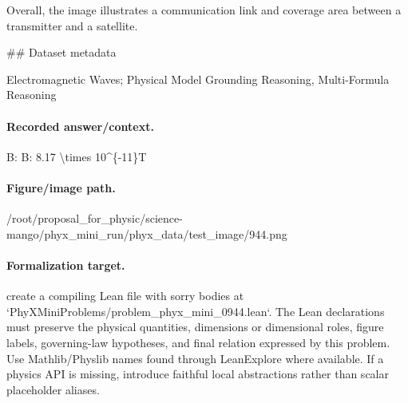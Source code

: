 Overall, the image illustrates a communication link and coverage area between a transmitter and a satellite.

\#\# Dataset metadata

Electromagnetic Waves; Physical Model Grounding Reasoning, Multi-Formula Reasoning

\paragraph{Recorded answer/context.}
B: B: 8.17 \textbackslash{}times 10\textasciicircum{}\{-11\}T

\paragraph{Figure/image path.}
/root/proposal\_for\_physic/science-mango/phyx\_mini\_run/phyx\_data/test\_image/944.png

\paragraph{Formalization target.}
create a compiling Lean file with sorry bodies at `PhyXMiniProblems/problem\_phyx\_mini\_0944.lean`. The Lean declarations must preserve the physical quantities, dimensions or dimensional roles, figure labels, governing-law hypotheses, and final relation expressed by this problem.
Use Mathlib/Physlib names found through LeanExplore where available. If a physics API is missing, introduce faithful local abstractions rather than scalar placeholder aliases.

